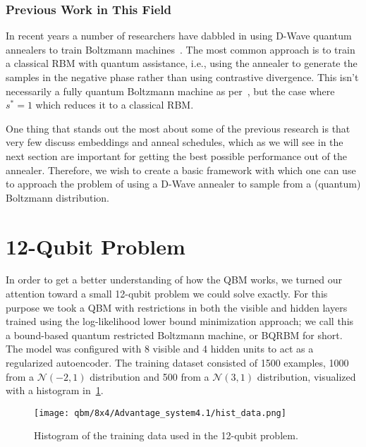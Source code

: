 \subsubsection{Previous Work in This Field}
In recent years a number of researchers have dabbled in using D-Wave quantum annealers to train Boltzmann machines~\cite{adachi_2015,benedetti_2016,anschuetz_2019,wiebe_2019,rocutto_2020,dixit_2021,ilmo_2021,wilson_2021,xu_2021}.
The most common approach is to train a classical RBM with quantum assistance, i.e., using the annealer to generate the samples in the negative phase rather than using contrastive divergence.
This isn't necessarily a fully quantum Boltzmann machine as per~\cite{amin_2018}, but the case where \( s^* = 1 \) which reduces it to a classical RBM.

One thing that stands out the most about some of the previous research is that very few discuss embeddings and anneal schedules, which as we will see in the next section are important for getting the best possible performance out of the annealer.
Therefore, we wish to create a basic framework with which one can use to approach the problem of using a D-Wave annealer to sample from a (quantum) Boltzmann distribution.

\section{12-Qubit Problem}
In order to get a better understanding of how the QBM works, we turned our attention toward a small 12-qubit problem we could solve exactly.
For this purpose we took a QBM with restrictions in both the visible and hidden layers trained using the log-likelihood lower bound minimization approach; we call this a bound-based quantum restricted Boltzmann machine, or BQRBM for short.
The model was configured with 8 visible and 4 hidden units to act as a regularized autoencoder.
The training dataset consisted of 1500 examples, 1000 from a \( \mathcal{N}(-2, 1) \) distribution and 500 from a \( \mathcal{N}(3, 1) \) distribution, visualized with a histogram in~\cref{fig:hist_data}.

\begin{figure}[!htb]
    \begin{center}
        \texttt{[image: qbm/8x4/Advantage\_system4.1/hist\_data.png]}
    \end{center}
    \caption{Histogram of the training data used in the 12-qubit problem.}
    \label{fig:hist_data}
\end{figure}

